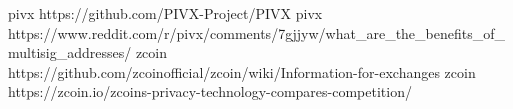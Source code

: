 \documentclass[
  printed, %
  table,   %
  nolof,     %
  nolot,     %
           oneside, color
]{fithesis3}
\begin{document}
\printbibliography[heading=bibintoc]

\appendix %
pivx https://github.com/PIVX-Project/PIVX
pivx https://www.reddit.com/r/pivx/comments/7gjjyw/what_are_the_benefits_of_multisig_addresses/
zcoin https://github.com/zcoinofficial/zcoin/wiki/Information-for-exchanges
zcoin https://zcoin.io/zcoins-privacy-technology-compares-competition/
\end{document}
